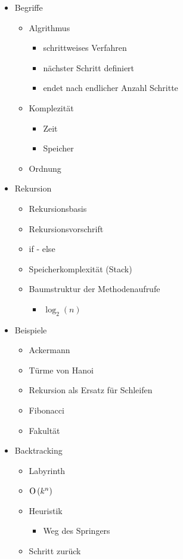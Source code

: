 \begin{itemize}
    \item Begriffe
    \begin{itemize}
        \item Algrithmus
        \begin{itemize}
            \item schrittweises Verfahren
            \item nächster Schritt definiert
            \item endet nach endlicher Anzahl Schritte
        \end{itemize}
        \item Komplezität
        \begin{itemize}
            \item Zeit
            \item Speicher
        \end{itemize}
        \item Ordnung
    \end{itemize}
    
    \item Rekursion
    \begin{itemize}
        \item Rekursionsbasis
        \item Rekursionsvorschrift
        \item if - else
        \item Speicherkomplexität (Stack)
        \item Baumstruktur der Methodenaufrufe
        \begin{itemize}
            \item $\log_2(n)$
        \end{itemize}
    \end{itemize}
    
    \item Beispiele
    \begin{itemize}
        \item Ackermann
        \item Türme von Hanoi
        \item Rekursion als Ersatz für Schleifen
        \item Fibonacci
        \item Fakultät
    \end{itemize}
    
    \item Backtracking
    \begin{itemize}
        \item Labyrinth
        \item $\operatorname{O}\left(k^n\right)$
        \item Heuristik
        \begin{itemize}
            \item Weg des Springers
        \end{itemize}
        \item Schritt zurück
    \end{itemize}
    

\end{itemize}
